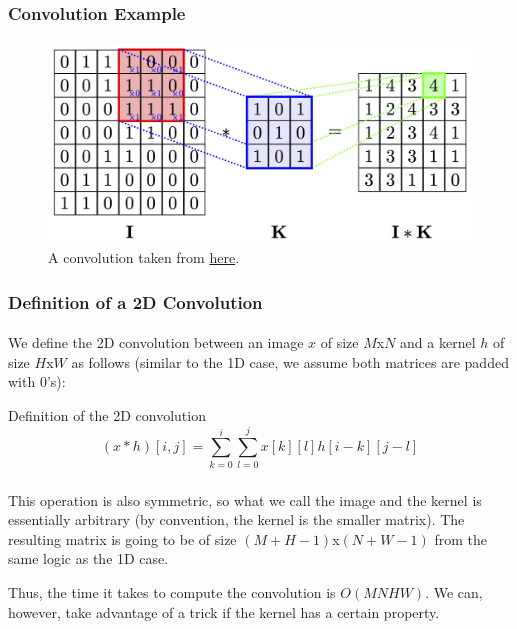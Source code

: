 \documentclass[11pt,handout]{beamer}             %
\begin{document}
\begin{frame}
\frametitle{Convolution Example}
\framesubtitle{}
\begin{figure}[h!]
  \centering
  \includegraphics[scale=1]{conv.png}
  \caption{A convolution taken from \href{https://petar-v.com/GAT/}{here}.}
\end{figure}
\end{frame}

\begin{frame}
\frametitle{Definition of a 2D Convolution}
\framesubtitle{}
We define the 2D convolution between an image \( x \) of size \( M \)x\( N \)
and a kernel \( h \) of size \( H \)x\( W \) as follows
(similar to the 1D case, we assume both matrices are padded with 0's):
\begin{alertblock}{Definition of the 2D convolution}
  \[ (x * h)[i, j] = \sum^i_{k = 0} \sum^j_{l = 0} x[k][l]h[i - k][j - l] \]
\end{alertblock}
\end{frame}

\begin{frame}
\frametitle{}
\framesubtitle{}
This operation is also symmetric, so  what we call the image and the kernel
is essentially arbitrary (by convention, the kernel is the smaller matrix).
The resulting matrix is going to be of size \( (M + H - 1) \)x\( (N + W - 1) \)
from the same logic as the 1D case. \pause 

Thus, the time it takes to compute the convolution is \( O(MNHW) \).
We can, however, take advantage of a trick if the kernel has a certain property.
\end{frame}
\end{document}
